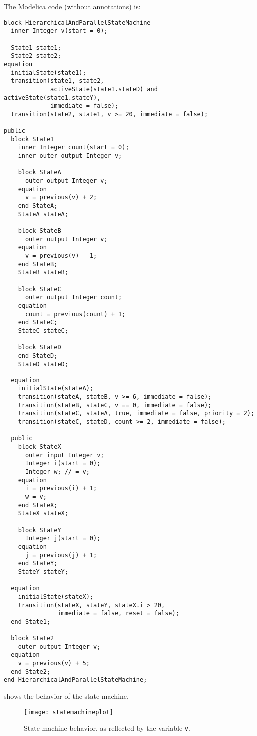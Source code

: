 \begin{example}
The Modelica code (without annotations) is:
\begin{lstlisting}[language=modelica]
block HierarchicalAndParallelStateMachine
  inner Integer v(start = 0);

  State1 state1;
  State2 state2;
equation
  initialState(state1);
  transition(state1, state2,
             activeState(state1.stateD) and activeState(state1.stateY),
             immediate = false);
  transition(state2, state1, v >= 20, immediate = false);

public
  block State1
    inner Integer count(start = 0);
    inner outer output Integer v;

    block StateA
      outer output Integer v;
    equation
      v = previous(v) + 2;
    end StateA;
    StateA stateA;

    block StateB
      outer output Integer v;
    equation
      v = previous(v) - 1;
    end StateB;
    StateB stateB;

    block StateC
      outer output Integer count;
    equation
      count = previous(count) + 1;
    end StateC;
    StateC stateC;

    block StateD
    end StateD;
    StateD stateD;

  equation
    initialState(stateA);
    transition(stateA, stateB, v >= 6, immediate = false);
    transition(stateB, stateC, v == 0, immediate = false);
    transition(stateC, stateA, true, immediate = false, priority = 2);
    transition(stateC, stateD, count >= 2, immediate = false);

  public
    block StateX
      outer input Integer v;
      Integer i(start = 0);
      Integer w; // = v;
    equation
      i = previous(i) + 1;
      w = v;
    end StateX;
    StateX stateX;

    block StateY
      Integer j(start = 0);
    equation
      j = previous(j) + 1;
    end StateY;
    StateY stateY;

  equation
    initialState(stateX);
    transition(stateX, stateY, stateX.i > 20,
               immediate = false, reset = false);
  end State1;

  block State2
    outer output Integer v;
  equation
    v = previous(v) + 5;
  end State2;
end HierarchicalAndParallelStateMachine;
\end{lstlisting}

 shows the behavior of the state machine.
\begin{figure}[H]
  \begin{center}
    \texttt{[image: statemachineplot]}
  \end{center}
  \caption{
    State machine behavior, as reflected by the variable \lstinline!v!.
  }
  \label{fig:state-machine-behavior}
\end{figure}


\end{example}
